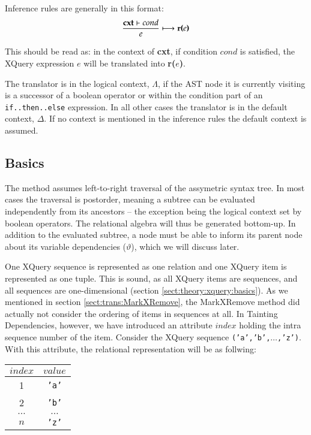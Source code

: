Inference rules are generally in this format:
\begin{equation*}
\frac{\mbox{\textbf{cxt}}\vdash cond}{e}\longmapsto \mbox{\textbf{r(}}e\mbox{\textbf{)}}
\end{equation*}

This should be read as: in the context of \textbf{cxt}, if condition $cond$ is satisfied, the XQuery expression
$e$ will be translated into \textbf{r(}$e$\textbf{)}.

The translator is in the logical context, $\Lambda$, if the AST node it is currently visiting is a successor of a
boolean operator or within the condition part of an \texttt{if..then..else} expression. In all other cases the
translator is in the default context, $\Delta$. If no context is mentioned in the inference rules the default
context is assumed.

\subsection{Basics}
\label{sect:trans:TD:basics}
The method assumes left-to-right traversal of the assymetric syntax tree. In most cases the traversal is
postorder, meaning a subtree can be evaluated independently from its ancestors -- the exception being the logical
context set by boolean operators. The relational algebra will thus be generated bottom-up. In addition to the
evaluated subtree, a node must be able to inform its parent node about its variable dependencies ($\vartheta$),
which we will discuss later.

One XQuery sequence is represented as one relation and one XQuery item is represented as one tuple. This is sound,
as all XQuery items are sequences, and all sequences are one-dimensional (section
\ref{sect:theory:xquery:basics}). As we mentioned in section \ref{sect:trans:MarkXRemove}, the MarkXRemove method
did actually not consider the ordering of items in sequences at all. In Tainting Dependencies, however, we have
introduced an attribute $index$ holding the intra sequence number of the item. Consider the XQuery sequence
\texttt{('a','b',}$\ldots$\texttt{,'z')}. With this attribute, the relational representation will be as follwing:

\begin{center}
\begin{tabular}{|c|c|} \hline
$index$ & $value$ \\\hline
1		& \texttt{'a'} \\\hline
2		& \texttt{'b'} \\\hline
$\ldots$& $\ldots$ \\\hline
$n$		& \texttt{'z'} \\\hline
\end{tabular}
\end{center}


